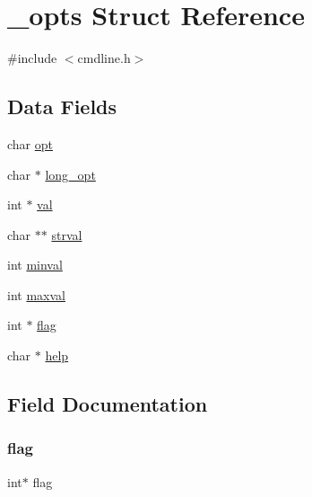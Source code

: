 \hypertarget{struct__opts}{}\section{\+\_\+opts Struct Reference}
\label{struct__opts}


{\ttfamily \#include $<$cmdline.\+h$>$}

\subsection*{Data Fields}
\begin{DoxyCompactItemize}
\item 
char \hyperlink{struct__opts_a6b9d817d08c1417f5c533eb8ad775312}{opt}
\item 
char $\ast$ \hyperlink{struct__opts_a7f3bcf2257216658f3373eb1ddeb2015}{long\+\_\+opt}
\item 
int $\ast$ \hyperlink{struct__opts_a482251298d068445d0ecb6f0c6ed54a7}{val}
\item 
char $\ast$$\ast$ \hyperlink{struct__opts_af73ae416c67aed8a7d20e52e1d4e8771}{strval}
\item 
int \hyperlink{struct__opts_a271861b7d4422e3cddf03d604408cf3a}{minval}
\item 
int \hyperlink{struct__opts_ab78d5bc0b5eb537373d2ae9db01011b4}{maxval}
\item 
int $\ast$ \hyperlink{struct__opts_a4f1a91bc2d61b12ffb90ff2857d6a4d8}{flag}
\item 
char $\ast$ \hyperlink{struct__opts_a67b7e976c6444c3d7fab151527bdae33}{help}
\end{DoxyCompactItemize}


\subsection{Field Documentation}
\mbox{\label{struct__opts_a4f1a91bc2d61b12ffb90ff2857d6a4d8}} 
\subsubsection{\texorpdfstring{flag}{flag}}
{\footnotesize\ttfamily int$\ast$ flag}

\mbox{\label{struct__opts_a67b7e976c6444c3d7fab151527bdae33}} 
